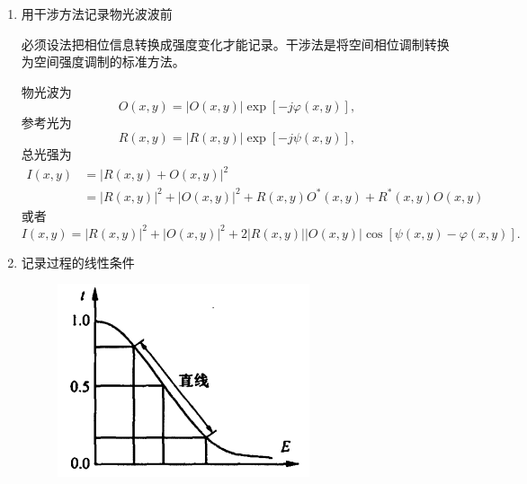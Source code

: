 \documentclass[UTF8]{ctexart}
\begin{document}
\begin{enumerate}
    \item 用干涉方法记录物光波波前

    必须设法把相位信息转换成强度变化才能记录。干涉法是将空间相位调制转换为空间强度调制的标准方法。

    物光波为
    \begin{equation}
        {O}\left( {x,y} \right) = \left|O\left( {x,y} \right)\right|\exp \left[ { - j\varphi \left( {x,y} \right)} \right],
    \end{equation}
    参考光为
    \begin{equation}
        {R}\left( {x,y} \right) = \left|R\left( {x,y} \right)\right|\exp \left[ { - j\psi \left( {x,y} \right)} \right],
    \end{equation}
    总光强为
    \begin{equation}
        \begin{aligned}
                I\left( {x,y} \right) &= {\left| {R\left( {x,y} \right) + O\left( {x,y} \right)} \right|^2}\\
                 &= {\left| {R\left( {x,y} \right)} \right|^2} + {\left| {O\left( {x,y} \right)} \right|^2} + R\left( {x,y} \right){O^*}\left( {x,y} \right) + {R^*}\left( {x,y} \right)O\left( {x,y} \right)
        \end{aligned}
    \end{equation}
    或者
    \begin{equation}
        I\left( {x,y} \right) = {\left| {R\left( {x,y} \right)} \right|^2} + {\left| {O\left( {x,y} \right)} \right|^2} + 2\left| {R\left( {x,y} \right)} \right|\left| {O\left( {x,y} \right)} \right|\cos \left[ {\psi \left( {x,y} \right) - \varphi \left( {x,y} \right)} \right].
    \end{equation}
    \item 记录过程的线性条件
    \begin{figure}[htbp]
        \centering
        \includegraphics[width=0.7\textwidth]{2.PNG}

\end{figure}
\end{enumerate}
\end{document}
